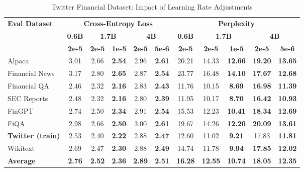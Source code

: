 
\begin{table}[htbp]
\centering
\caption[Twitter Financial: Learning Rate Comparison]{Twitter Financial Dataset: Impact of Learning Rate Adjustments}
\label{tab:twitter_lr_comparison}
\begin{tabular}{l|c|cc|cc|c|cc|cc}
\hline
\multirow{3}{*}{\textbf{Eval Dataset}} &
\multicolumn{5}{c|}{\textbf{Cross-Entropy Loss}} &
\multicolumn{5}{c}{\textbf{Perplexity}} \\
\cline{2-6} \cline{7-11}
& \textbf{0.6B} & \multicolumn{2}{c|}{\textbf{1.7B}} & \multicolumn{2}{c|}{\textbf{4B}} &
 \textbf{0.6B} & \multicolumn{2}{c|}{\textbf{1.7B}} & \multicolumn{2}{c}{\textbf{4B}} \\
\cline{3-4} \cline{5-6} \cline{8-9} \cline{10-11}
& \textbf{2e-5} & \textbf{2e-5} & \textbf{1e-5} & \textbf{2e-5} & \textbf{5e-6} &
 \textbf{2e-5} & \textbf{2e-5} & \textbf{1e-5} & \textbf{2e-5} & \textbf{5e-6} \\
\hline
 Alpaca & 3.01 & 2.66 & \textbf{2.54} & 2.96 & \textbf{2.61} & 20.21 & 14.33 & \textbf{12.66} & \textbf{19.20} & \textbf{13.65} \\
Financial News & 3.17 & 2.80 & \textbf{2.65} & 2.87 & \textbf{2.54} & 23.77 & 16.48 & \textbf{14.10} & \textbf{17.67} & \textbf{12.68} \\
Financial QA & 2.46 & 2.32 & \textbf{2.16} & 2.83 & \textbf{2.43} & 11.76 & 10.15 & \textbf{8.69} & \textbf{16.98} & \textbf{11.39} \\
SEC Reports & 2.48 & 2.32 & \textbf{2.16} & 2.80 & \textbf{2.39} & 11.95 & 10.17 & \textbf{8.70} & \textbf{16.42} & \textbf{10.93} \\
FinGPT & 2.74 & 2.50 & \textbf{2.34} & 2.91 & \textbf{2.54} & 15.53 & 12.23 & \textbf{10.41} & \textbf{18.34} & \textbf{12.69} \\
FiQA & 2.98 & 2.66 & \textbf{2.50} & 3.00 & \textbf{2.61} & 19.67 & 14.26 & \textbf{12.20} & \textbf{20.09} & \textbf{13.61} \\
\rowcolor{gray!20} \textbf{Twitter (train)} & 2.53 & 2.40 & \textbf{2.22} & 2.88 & \textbf{2.47} & 12.60 & 11.02 & \textbf{9.21} & 17.83 & \textbf{11.81} \\
Wikitext & 2.69 & 2.47 & \textbf{2.30} & 2.88 & \textbf{2.49} & 14.74 & 11.78 & \textbf{9.94} & \textbf{17.85} & \textbf{12.02} \\
\rowcolor{blue!10} \textbf{Average} & \textbf{2.76} & \textbf{2.52} & \textbf{2.36} & \textbf{2.89} & \textbf{2.51} & \textbf{16.28} & \textbf{12.55} & \textbf{10.74} & \textbf{18.05} & \textbf{12.35}  \\
\hline
\end{tabular}
\end{table}
